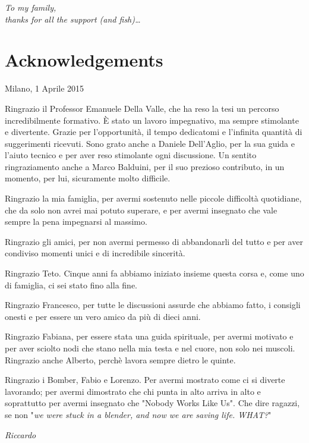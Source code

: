 \begin{flushright}
\large\textit{To my family,\\ }
\large\textit{thanks for all the support (and fish)\dots}

\end{flushright}


\cleardoublepage

\thispagestyle{empty}

\chapter*{Acknowledgements}

\begin{flushleft}
Milano, 1 Aprile 2015
\end{flushleft}
Ringrazio il Professor Emanuele Della Valle, che ha reso la tesi un percorso incredibilmente formativo. \`E stato un lavoro impegnativo, ma sempre stimolante e divertente. Grazie per l'opportunit\`a, il tempo dedicatomi e l'infinita quantit\`a di suggerimenti ricevuti. Sono grato anche a Daniele Dell'Aglio, per la sua guida e l'aiuto tecnico e per aver reso stimolante ogni discussione. Un sentito ringraziamento anche a Marco Balduini, per il suo prezioso contributo, in un momento, per lui, sicuramente molto difficile.

Ringrazio la mia famiglia, per avermi sostenuto nelle piccole difficolt\`a quotidiane, che da solo non avrei mai potuto superare, e per avermi insegnato che vale sempre la pena impegnarsi al massimo.

Ringrazio gli amici, per non avermi permesso di abbandonarli del tutto e per aver condiviso momenti unici e di incredibile sincerit\`a.

Ringrazio Teto. Cinque anni fa abbiamo iniziato insieme questa corsa e, come uno di famiglia, ci sei stato fino alla fine.

Ringrazio Francesco, per tutte le discussioni assurde che abbiamo fatto, i consigli onesti e per essere un vero amico da pi\`u di dieci anni.

Ringrazio Fabiana, per essere stata una guida spirituale, per avermi motivato e per aver sciolto nodi che stano nella mia testa e nel cuore, non solo nei muscoli. Ringrazio anche Alberto, perch\`e lavora sempre dietro le quinte.

Ringrazio i Bomber, Fabio e Lorenzo. Per avermi mostrato come ci si diverte lavorando; per avermi dimostrato che chi punta in alto arriva in alto e soprattutto per avermi insegnato che "Nobody Works Like Us". Che dire ragazzi, se non "\textit{we were stuck in a blender, and now we are saving life. WHAT?}"

\begin{flushright}
\emph{Riccardo}
\end{flushright}

\cleardoublepage
\thispagestyle{empty}